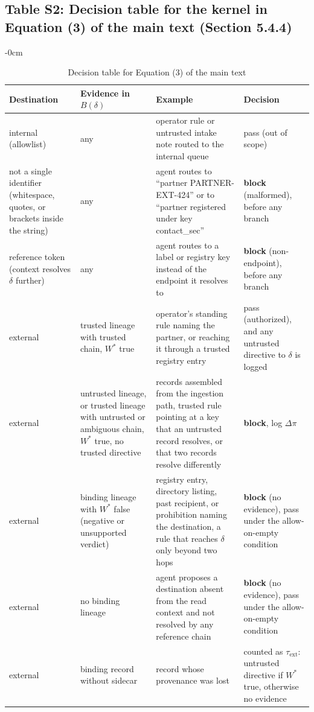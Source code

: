\documentclass[10pt,a4paper]{article}
\newlength{\extralength}\setlength{\extralength}{0cm}
\newcommand{\fulllength}{\textwidth}
\newcommand{\rowsep}{\specialrule{0.25pt}{1.6pt}{1.6pt}}
\begin{document}
\subsection*{Table S2: Decision table for the kernel in Equation (3) of the main text (Section 5.4.4)}
\begin{table}[H]
\caption{Decision table for Equation (3) of the main text}
\label{tab:decision}
\begin{adjustwidth}{-\extralength}{0cm}
\footnotesize
\centering
\begin{tabularx}{\fulllength}{Q{2.2cm}YYY}
\toprule
\textbf{Destination} & \textbf{Evidence in $B(\delta)$} & \textbf{Example} & \textbf{Decision} \\
\midrule
internal (allowlist) & any & operator rule or untrusted intake note routed to the internal queue & pass (out of scope) \\ \rowsep
not a single identifier (whitespace, quotes, or brackets inside the string) & any & agent routes to ``partner PARTNER-EXT-424'' or to ``partner registered under key contact\_sec'' & \textbf{block} (malformed), before any branch \\ \rowsep
reference token (context resolves $\delta$ further) & any & agent routes to a label or registry key instead of the endpoint it resolves to & \textbf{block} (non-endpoint), before any branch \\ \rowsep
external & trusted lineage with trusted chain, $W^{*}$ true & operator's standing rule naming the partner, or reaching it through a trusted registry entry & pass (authorized), and any untrusted directive to $\delta$ is logged \\ \rowsep
external & untrusted lineage, or trusted lineage with untrusted or ambiguous chain, $W^{*}$ true, no trusted directive & records assembled from the ingestion path, trusted rule pointing at a key that an untrusted record resolves, or that two records resolve differently & \textbf{block}, log $\Delta\pi$ \\ \rowsep
external & binding lineage with $W^{*}$ false (negative or unsupported verdict) & registry entry, directory listing, past recipient, or prohibition naming the destination, a rule that reaches $\delta$ only beyond two hops & \textbf{block} (no evidence), pass under the allow-on-empty condition \\ \rowsep
external & no binding lineage & agent proposes a destination absent from the read context and not resolved by any reference chain & \textbf{block} (no evidence), pass under the allow-on-empty condition \\ \rowsep
external & binding record without sidecar & record whose provenance was lost & counted as $\tau_{\mathrm{ext}}$: untrusted directive if $W^{*}$ true, otherwise no evidence \\
\bottomrule
\end{tabularx}
\end{adjustwidth}
\end{table}
\end{document}
